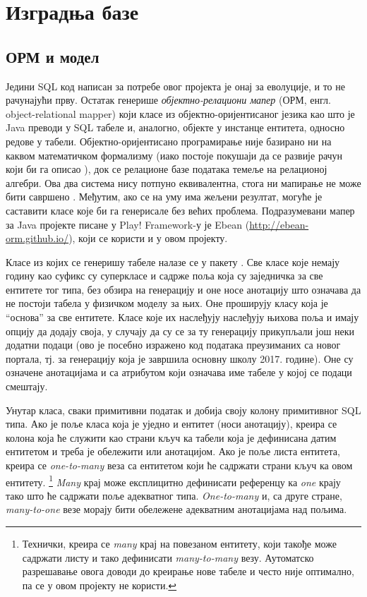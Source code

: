 \section{Изградња базе}\label{sec:4.4}

\subsection{ОРМ и модел}

Једини SQL код написан за потребе овог пројекта је онај за еволуције, и то не рачунајући прву. Остатак генерише \emph{објектно-релациони мапер} (ОРМ, енгл. object-relational mapper) који класе из објектно-оријентисаног језика као што је Java преводи у SQL табеле и, аналогно, објекте у инстанце ентитета, односно редове у табели. Објектно-оријентисано програмирање није базирано ни на каквом математичком формализму (иако постоје покушаји да се развије рачун који би га описао \citep{abadi2012theory}), док се релационе базе података темеље на релационој алгебри. Ова два система нису потпуно еквивалентна, стога ни мапирање не може бити савршено \citep{barnes2007object}. Међутим, ако се на уму има жељени резултат, могуће је саставити класе које би га генерисале без већих проблема. Подразумевани мапер за Java пројекте писане у Play! Framework-у је Ebean (\url{http://ebean-orm.github.io/}), који се користи и у овом пројекту.

Класе из којих се генеришу табеле налазе се у пакету . Све класе које немају годину као суфикс су суперкласе и садрже поља која су заједничка за све ентитете тог типа, без обзира на генерацију и оне носе анотацију  што означава да не постоји табела у физичком моделу за њих. Оне проширују класу  која је \enquote{основа} за све ентитете. Класе које их наслеђују наслеђују њихова поља и имају опцију да додају своја, у случају да су се за ту генерацију прикупљали још неки додатни подаци (ово је посебно изражено код података преузиманих са новог портала, тј. за генерацију која је завршила основну школу 2017. године). Оне су означене анотацијама  и  са атрибутом  који означава име табеле у којој се подаци смештају.

Унутар класа, сваки примитивни податак и  добија своју колону примитивног SQL типа. Ако је поље класа која је уједно и ентитет (носи  анотацију), креира се колона која ће служити као страни кључ ка табели која је дефинисана датим ентитетом и треба је обележити  или  анотацијом. Ако је поље листа ентитета, креира се \emph{one-to-many} веза са ентитетом који ће садржати страни кључ ка овом ентитету. \footnote{Технички, креира се \textit{many} крај на повезаном ентитету, који такође може садржати листу и тако дефинисати \emph{many-to-many} везу. Аутоматско разрешавање овога доводи до креирање нове табеле и често није оптимално, па се у овом пројекту не користи.} \textit{Many} крај може експлицитно дефинисати референцу ка \textit{one} крају тако што ће садржати поље адекватног типа. \textit{One-to-many} и, са друге стране, \emph{many-to-one} везе морају бити обележене адекватним анотацијама над пољима.

